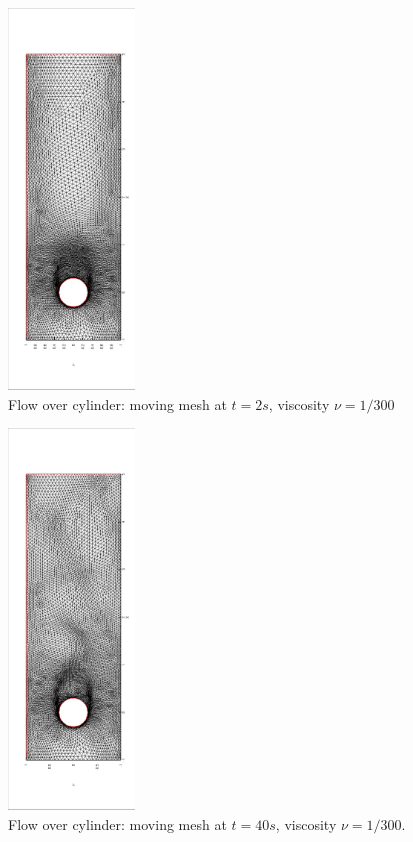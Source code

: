       \begin{figure}[!htbp]
        \centering
        \includegraphics[width = 0.3\textwidth, angle = -90]{picture/second/obstacle_flow_data/mesh_t_2s.eps}
        \caption{\small Flow over cylinder: moving mesh at $t = 2s$,
          viscosity $\nu = 1/300$}
        \label{fig::cylinder_mesh_2s}
      \end{figure}

      \begin{figure}[!htbp]
        \centering
        \includegraphics[width = 0.3\textwidth, angle = -90]{picture/second/obstacle_flow_data/mesh_t_40s.eps}
        \caption{\small Flow over cylinder: moving mesh at $t = 40s$,
          viscosity $\nu = 1/300$.}
        \label{fig::cylinder_mesh_40s}
      \end{figure}



